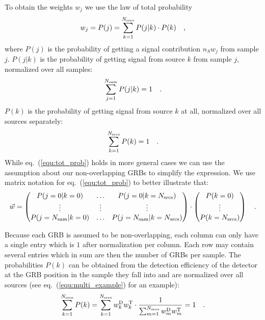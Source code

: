 To obtain the weights $w_j$ we use the law of total probability
\begin{equation}
  w_j = P(j) = \sum_{k=1}^{N_\text{srcs}} P(j| k)\cdot P(k) \quad\text{,}
\label{equ:tot_prob}
\end{equation}
where $P(j)$ is the probability of getting a signal contribution $\hat{n}_S w_j$ from sample $j$.
$P(j|k)$ is the probability of getting signal from source $k$ from sample $j$, normalized over all samples:
\begin{equation}
  \sum_{j=1}^{N_\text{sam}} P(j|k) = 1 \quad\text{.}
\end{equation}
$P(k)$ is the probability of getting signal from source $k$ at all, normalized over all sources separately:
\begin{equation}
  \sum_{k=1}^{N_\text{srcs}} P(k) = 1 \quad\text{.}
\end{equation}
While eq.~(\ref{equ:tot_prob}) holds in more general cases we can use the assumption about our non-overlapping GRBs to simplify the expression.
We use matrix notation for eq.~(\ref{equ:tot_prob}) to better illustrate that:
\begin{equation}
  \vec{w} =
    \begin{pmatrix}
      P(j=0|k=0) & \dots & P(j=0|k=N_\text{srcs}) \\
      \vdots & \vdots & \vdots \\
      P(j=N_\text{sam}|k=0) & \dots & P(j=N_\text{sam}|k=N_\text{srcs})
    \end{pmatrix} \cdot
    \begin{pmatrix}
      P(k=0) \\ \vdots \\ P(k=N_\text{srcs})
    \end{pmatrix} \quad\text{.}
\end{equation}

Because each GRB is assumed to be non-overlapping, each column can only have a single entry which is $1$ after normalization per column.
Each row may contain several entries which in sum are then the number of GRBs per sample.
The probabilities $P(k)$ can be obtained from the detection efficiency of the detector at the GRB position in the sample they fall into and are normalized over all sources (see eq.~(\ref{equ:multi_example}) for an example):
\begin{equation}
  \sum_{k=1}^{N_\text{srcs}} P(k)
    = \sum_{k=1}^{N_\text{srcs}} w^\text{D}_k w^\text{T}_k \cdot
      \frac{1}{\sum_{m=1}^{N_\text{srcs}} w^\text{D}_m w^\text{T}_m}
    = 1
  \quad\text{.}
\end{equation}

